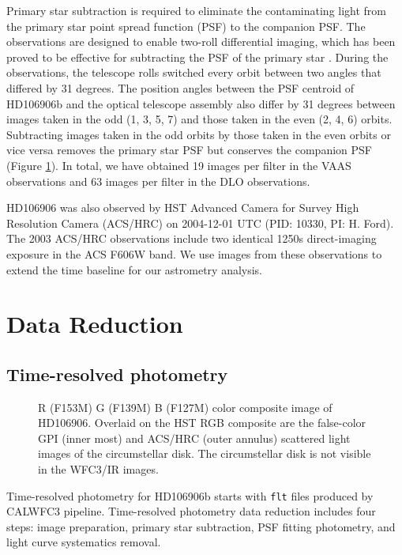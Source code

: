 \documentclass[twocolumn]{aastex62}
\begin{document}
Primary star subtraction is required to eliminate the contaminating light from the primary star point spread function (PSF) to the companion PSF. The observations are designed to enable two-roll differential imaging, which has been proved to be effective for subtracting the PSF of the primary star \citep{Zhou2016,Zhou2019}. During the observations, the telescope rolls switched every orbit between two angles that differed by 31 degrees. The position angles between the PSF centroid of HD106906b and the optical telescope assembly also differ by 31 degrees between images taken in the odd (1, 3, 5, 7) and those taken in the even (2, 4, 6) orbits. Subtracting images taken in the odd orbits by those taken in the even orbits or vice versa removes the primary star PSF but conserves the companion PSF (Figure \ref{fig:2rdi}). In total, we have obtained 19 images per filter in the VAAS observations and 63 images per filter in the DLO observations. 

HD106906 was also observed by HST Advanced Camera for Survey High Resolution Camera (ACS/HRC) on 2004-12-01 UTC (PID: 10330, PI: H. Ford). The 2003 ACS/HRC observations include two identical 1250s direct-imaging exposure in the ACS F606W band. We use images from these observations to extend the time baseline for our astrometry analysis.

\section{Data Reduction}

\subsection{Time-resolved photometry}
\begin{figure}
  \centering
  \caption{R (F153M) G (F139M) B (F127M) color composite image of HD106906. Overlaid on the HST RGB composite are the false-color GPI (inner most) and ACS/HRC (outer annulus) scattered light images \citep{Kalas2015} of the circumstellar disk. The circumstellar disk is not visible in the WFC3/IR images.}
  \label{fig:2rdi}
\end{figure}

Time-resolved photometry for HD106906b starts with \texttt{flt} files produced by CALWFC3 pipeline. Time-resolved photometry data reduction includes four steps: image preparation, primary star subtraction, PSF fitting photometry, and light curve systematics removal.
\end{document}
